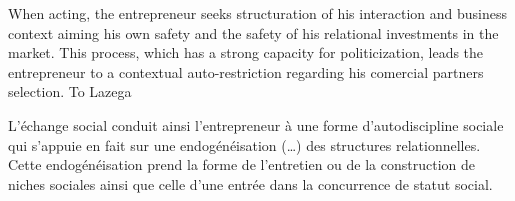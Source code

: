 \documentclass[a4paper, 12pt, openright, oneside, german, french, brazil, english, article]{abntex2}
\begin{document}
	
	When acting, the entrepreneur seeks structuration of his interaction and business context aiming his own safety and the safety of his relational investments in the market. This process, which has a strong capacity for politicization, leads the entrepreneur to a contextual auto-restriction regarding his comercial partners selection. To Lazega
	
	\begin{citacao}
		L'échange social conduit ainsi l'entrepreneur à une forme d'autodiscipline sociale qui s'appuie en fait sur une endogénéisation (\dots) des structures relationnelles. Cette endogénéisation prend la forme de l'entretien ou de la construction de niches sociales ainsi que celle d'une entrée dans la concurrence de statut social. \cite[p. 572]{lazega2009theorie}
	\end{citacao}
	
	
\end{document}
